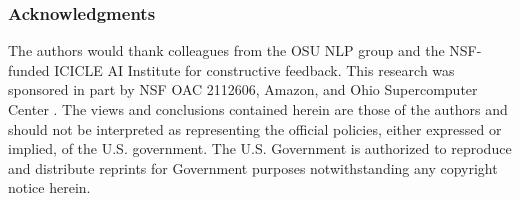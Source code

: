 \documentclass{article} %
\begin{document}
\subsubsection*{Acknowledgments}
The authors would thank colleagues from the OSU NLP group and the NSF-funded ICICLE AI Institute for constructive feedback. This research was sponsored in part by NSF OAC 2112606, Amazon, and Ohio Supercomputer Center \citep{OhioSupercomputerCenter1987}. The views and conclusions contained herein are those of the authors and should not be interpreted as representing the official policies, either expressed or implied, of the U.S. government. The U.S. Government is authorized to reproduce and distribute reprints for Government purposes notwithstanding any copyright notice herein.





\newpage
\appendix

\end{document}

